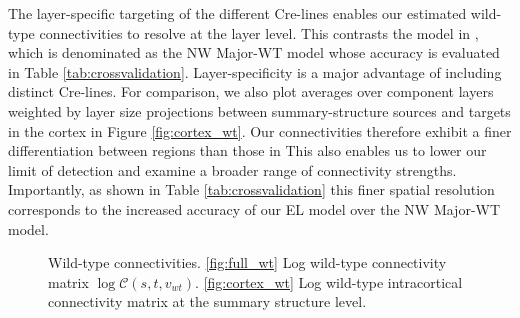 The layer-specific targeting of the different Cre-lines enables our estimated wild-type connectivities to resolve at the layer level.
This contrasts the model in \citet{Knox2019-ot}, which is denominated as the NW Major-WT model whose accuracy is evaluated in Table \ref{tab:crossvalidation}.
Layer-specificity is a major advantage of including distinct Cre-lines.
For comparison, we also plot averages over component layers weighted by layer size projections between summary-structure sources and targets in the cortex in Figure \ref{fig:cortex_wt}.
Our connectivities therefore exhibit a finer differentiation between regions than those in \citet{Knox2019-ot}
This also enables us to lower our limit of detection and examine a broader range of connectivity strengths.
Importantly, as shown in Table \ref{tab:crossvalidation} this finer spatial resolution corresponds to the increased accuracy of our EL model over the NW Major-WT model.

\newpage

\begin{figure}[H]
\centering
        \newline
   \caption{Wild-type connectivities.
   \ref{fig:full_wt} Log wild-type connectivity matrix $\log \mathcal {C} (s,t,v_{wt})$.
   \ref{fig:cortex_wt} Log wild-type intracortical connectivity matrix at the summary structure level.}
   \label{fig:connectome}
\end{figure}

